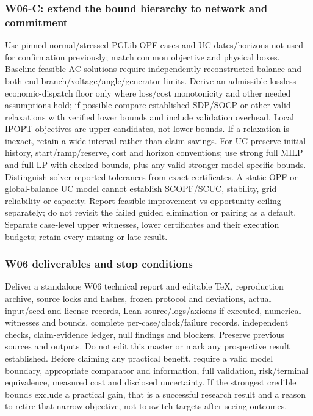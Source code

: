 \subsubsection{W06-C: extend the bound hierarchy to network and commitment}
Use pinned normal/stressed PGLib-OPF cases and UC dates/horizons not used for confirmation previously; match common objective and physical boxes. Baseline feasible AC solutions require independently reconstructed balance and both-end branch/voltage/angle/generator limits. Derive an admissible lossless economic-dispatch floor only where loss/cost monotonicity and other needed assumptions hold; if possible compare established SDP/SOCP or other valid relaxations with verified lower bounds and include validation overhead. Local IPOPT objectives are upper candidates, not lower bounds. If a relaxation is inexact, retain a wide interval rather than claim savings. For UC preserve initial history, start/ramp/reserve, cost and horizon conventions; use strong full MILP and full LP with checked bounds, plus any valid stronger model-specific bounds. Distinguish solver-reported tolerances from exact certificates. A static OPF or global-balance UC model cannot establish SCOPF/SCUC, stability, grid reliability or capacity. Report feasible improvement vs opportunity ceiling separately; do not revisit the failed guided elimination or pairing as a default. Separate case-level upper witnesses, lower certificates and their execution budgets; retain every missing or late result.

\subsubsection{W06 deliverables and stop conditions}
Deliver a standalone W06 technical report and editable TeX, reproduction archive, source locks and hashes, frozen protocol and deviations, actual input/seed and license records, Lean source/logs/axioms if executed, numerical witnesses and bounds, complete per-case/clock/failure records, independent checks, claim-evidence ledger, null findings and blockers. Preserve previous sources and outputs. Do not edit this master or mark any prospective result established. Before claiming any practical benefit, require a valid model boundary, appropriate comparator and information, full validation, risk/terminal equivalence, measured cost and disclosed uncertainty. If the strongest credible bounds exclude a practical gain, that is a successful research result and a reason to retire that narrow objective, not to switch targets after seeing outcomes.
